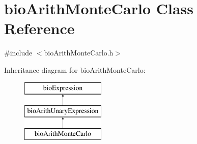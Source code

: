 \hypertarget{classbio_arith_monte_carlo}{}\section{bio\+Arith\+Monte\+Carlo Class Reference}
\label{classbio_arith_monte_carlo}


{\ttfamily \#include $<$bio\+Arith\+Monte\+Carlo.\+h$>$}

Inheritance diagram for bio\+Arith\+Monte\+Carlo\+:\begin{figure}[H]
\begin{center}
\leavevmode
\includegraphics[height=3.000000cm]{classbio_arith_monte_carlo}
\end{center}
\end{figure}
